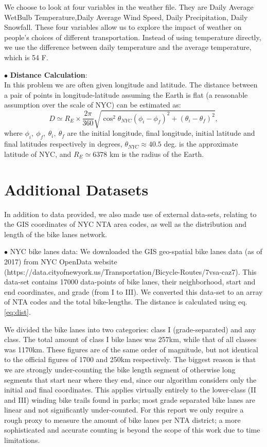 \documentclass[12pt]{article}
\begin{document}
We choose to look at four variables in the weather file. They are Daily Average WetBulb Temperature,Daily Average Wind Speed,	Daily Precipitation, Daily Snowfall. These four variables allow us to explore the impact of weather on people's choices of different transportation. Instead of using temperature directly, we use the difference between daily temperature and the average temperature, which is 54 F.

\newpage

$\bullet$ {\bf Distance Calculation}:\\
In this problem we are often given longitude and latitude. The distance between a pair of points in longitude-latitude assuming the Earth is flat (a reasonable assumption over the scale of NYC) can be estimated as:
\begin{equation}
\label{eq:dist}
    D \simeq R_E  \times \frac{2\pi}{360} \sqrt{\cos^2{\theta_{NYC}} (\phi_i - \phi_f)^2 + (\theta_i - \theta_f)^2},
\end{equation}
where $\phi_i, ~\phi_f, ~\theta_i, ~\theta_f$ are the initial longitude, final longitude, initial latitude and final latitudes respectively in degrees, $\theta_{NYC} \approx 40.5$ deg. is the approximate latitude of NYC, and $R_E \simeq 6378$ km is the radius of the Earth. 


\section*{Additional Datasets}
In addition to data provided, we also made use of external data-sets, relating to the GIS coordinates of NYC NTA area codes, as well as the distribution and length of the bike lanes network.

$\bullet$ NYC bike lanes data: We downloaded the GIS geo-spatial bike lanes data (as of 2017) from NYC OpenData website (https://data.cityofnewyork.us/Transportation/Bicycle-Routes/7vsa-caz7). This data-set contains 17000 data-points of bike lanes, their neighborhood, start and end coordinates, and grade (from I to III). We converted this data-set to an array of NTA codes and the total bike-lengths. The distance is calculated using eq. \ref{eq:dist}.

We divided the bike lanes into two categories: class I (grade-separated) and any class. The total amount of class I bike lanes was 257km, while that of all classes was 1170km. These figures are of the same order of magnitude, but not identical to the official figures of 1700 and 250km respectively. The biggest reason is that we are strongly under-counting the bike length segment of otherwise long segments that start near where they end, since our algorithm considers only the initial and final coordinates. This applies virtually entirely to the  lower-class (II and III) winding bike trails found in parks; most grade separated bike lanes are linear and not significantly under-counted. For this report we only require a rough proxy to measure the amount of bike lanes per NTA district; a more sophisticated and accurate counting is beyond the scope of this work due to time limitations.
\end{document}
